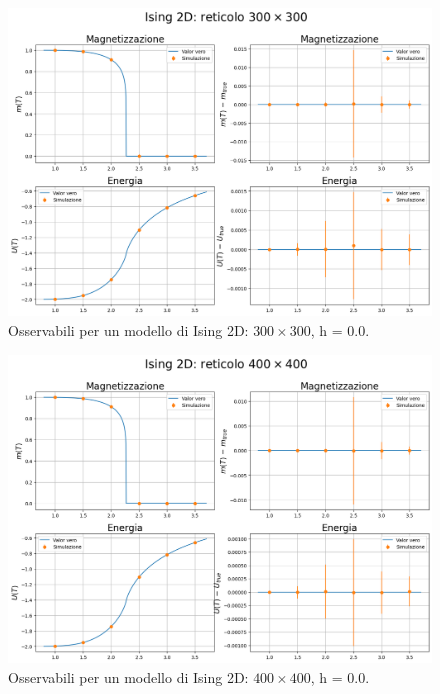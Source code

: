 \vspace*{\fill}



\vspace*{\fill}

\begin{figure}[htpb]
    \centering
    \includegraphics[page=1, width=\textwidth]{Immagini/simIsing2D/obs/obs_300.png}
    \caption{Osservabili per un modello di Ising 2D: $300 \times 300$, h = 0.0.}
\end{figure}

\vspace*{\fill}



\vspace*{\fill}

\begin{figure}[htpb]
    \centering
    \includegraphics[page=1, width=\textwidth]{Immagini/simIsing2D/obs/obs_400.png}
    \caption{Osservabili per un modello di Ising 2D: $400 \times 400$, h = 0.0.}
\end{figure}

